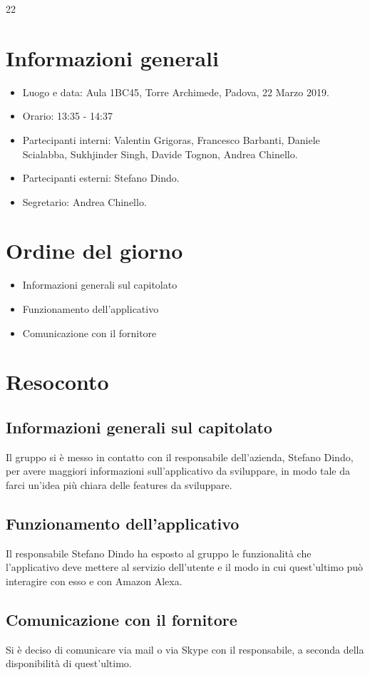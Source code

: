 
22\section{Informazioni generali}
\begin{itemize}
    \item Luogo e data: Aula 1BC45, Torre Archimede, Padova, 22 Marzo 2019.
    \item Orario: 13:35 - 14:37
    \item Partecipanti interni: Valentin Grigoras, Francesco Barbanti, Daniele Scialabba, Sukhjinder Singh, Davide Tognon, Andrea Chinello.
    \item Partecipanti esterni: Stefano Dindo.
    \item Segretario: Andrea Chinello.
\end{itemize}

\section{Ordine del giorno}
\begin{itemize}
    \item Informazioni generali sul capitolato
    \item Funzionamento dell'applicativo
    \item Comunicazione con il fornitore
\end{itemize}

\section{Resoconto}
\subsection{Informazioni generali sul capitolato}
Il gruppo si è messo in contatto con il responsabile dell'azienda, Stefano Dindo, per avere maggiori informazioni sull'applicativo da sviluppare, in modo tale da farci un'idea più chiara delle features da sviluppare.
\subsection{Funzionamento dell'applicativo}
Il responsabile Stefano Dindo ha esposto al gruppo le funzionalità che l'applicativo deve mettere al servizio dell'utente e il modo in cui quest'ultimo può interagire con esso e con Amazon Alexa.
\subsection{Comunicazione con il fornitore}
Si è deciso di comunicare via mail o via Skype con il responsabile, a seconda della disponibilità di quest'ultimo.